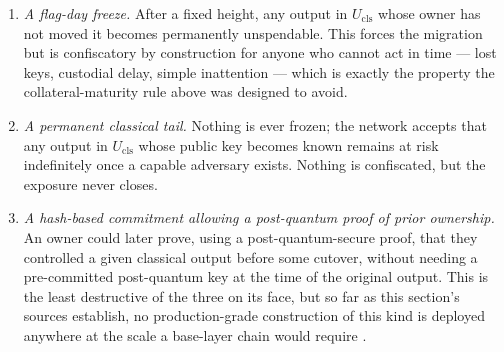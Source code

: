 \begin{enumerate}
\item \emph{A flag-day freeze.} After a fixed height, any output in $U_{\mathrm{cls}}$ whose owner has
not moved it becomes permanently unspendable. This forces the migration but is confiscatory by
construction for anyone who cannot act in time — lost keys, custodial delay, simple inattention — which
is exactly the property the collateral-maturity rule above was designed to avoid.
\item \emph{A permanent classical tail.} Nothing is ever frozen; the network accepts that any output in
$U_{\mathrm{cls}}$ whose public key becomes known remains at risk indefinitely once a capable adversary
exists. Nothing is confiscated, but the exposure never closes.
\item \emph{A hash-based commitment allowing a post-quantum proof of prior ownership.} An owner could
later prove, using a post-quantum-secure proof, that they controlled a given classical output before
some cutover, without needing a pre-committed post-quantum key at the time of the original output.
This is the least destructive of the three on its face, but so far as this section's sources establish,
no production-grade construction of this kind is deployed anywhere at the scale a base-layer chain
would require \srcinferred.
\end{enumerate}

